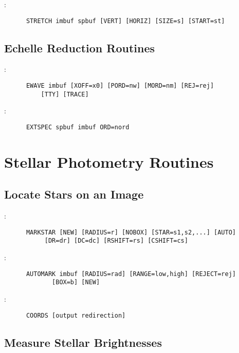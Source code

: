 \noindent {}:
\begin{verbatim}
      STRETCH imbuf spbuf [VERT] [HORIZ] [SIZE=s] [START=st]
\end{verbatim}

\subsection{Echelle Reduction Routines}

:
\begin{verbatim}
      EWAVE imbuf [XOFF=x0] [PORD=nw] [MORD=nm] [REJ=rej]
		  [TTY] [TRACE]
\end{verbatim}

\noindent {}:
\begin{verbatim}
      EXTSPEC spbuf imbuf ORD=nord
\end{verbatim}


\section{Stellar Photometry Routines}

\subsection{Locate Stars on an Image}

:
\begin{verbatim}
      MARKSTAR [NEW] [RADIUS=r] [NOBOX] [STAR=s1,s2,...] [AUTO]
	       [DR=dr] [DC=dc] [RSHIFT=rs] [CSHIFT=cs]
\end{verbatim}

\noindent {}:
\begin{verbatim}
      AUTOMARK imbuf [RADIUS=rad] [RANGE=low,high] [REJECT=rej]
		     [BOX=b] [NEW]
\end{verbatim}

\noindent {}:
\begin{verbatim}
      COORDS [output redirection]
\end{verbatim}

\subsection{Measure Stellar Brightnesses}

